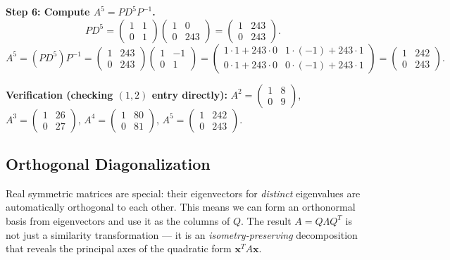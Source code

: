 \documentclass[12pt,a4paper]{article}
\begin{document}
\textbf{Step 6: Compute $A^5 = PD^5P^{-1}$.}
\[
  PD^5 = \begin{pmatrix}1&1\\0&1\end{pmatrix}\begin{pmatrix}1&0\\0&243\end{pmatrix}
       = \begin{pmatrix}1&243\\0&243\end{pmatrix}.
\]
\[
  A^5 = (PD^5)P^{-1} = \begin{pmatrix}1&243\\0&243\end{pmatrix}\begin{pmatrix}1&-1\\0&1\end{pmatrix}
       = \begin{pmatrix}1\cdot1+243\cdot0 & 1\cdot(-1)+243\cdot1 \\ 0\cdot1+243\cdot0 & 0\cdot(-1)+243\cdot1\end{pmatrix}
       = \begin{pmatrix}1&242\\0&243\end{pmatrix}.
\]

\textbf{Verification (checking $(1,2)$ entry directly):}
$A^2 = \begin{pmatrix}1&8\\0&9\end{pmatrix}$, $A^3 = \begin{pmatrix}1&26\\0&27\end{pmatrix}$, $A^4 = \begin{pmatrix}1&80\\0&81\end{pmatrix}$, $A^5 = \begin{pmatrix}1&242\\0&243\end{pmatrix}$. \checkmark


\subsection{Orthogonal Diagonalization}

Real symmetric matrices are special: their eigenvectors for \emph{distinct} eigenvalues are automatically orthogonal to each other.
This means we can form an orthonormal basis from eigenvectors and use it as the columns of $Q$.
The result $A = Q\Lambda Q^T$ is not just a similarity transformation --- it is an \emph{isometry-preserving} decomposition that reveals the principal axes of the quadratic form $\mathbf{x}^T A \mathbf{x}$.
\end{document}
